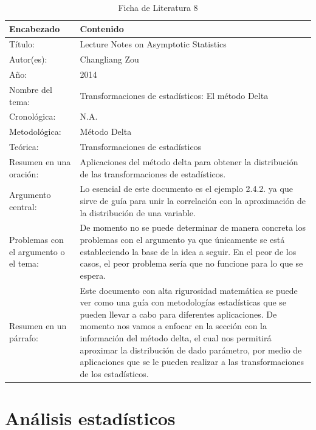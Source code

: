 \begin{table}[H]
    \caption{Ficha de Literatura 8}
    \begin{center}
        \begin{tabular}{  m{3cm} | m{12cm}  }
        \hline\textbf{ Encabezado} & \textbf{Contenido }\\ \hline
        Título: &  Lecture Notes on Asymptotic Statistics \\ \hline
        Autor(es): & Changliang Zou \\ \hline
        Año: &  2014\\ \hline
        Nombre del tema: &  Transformaciones de estadísticos: El método Delta\\ \hline
        Cronológica: &  N.A. \\ \hline
        Metodológica: & Método Delta \\  \hline
        Teórica: &  Transformaciones de estadísticos\\ \hline
        Resumen en una oración: &  Aplicaciones del método delta para obtener la distribución de las transformaciones de estadísticos. \\ \hline
        Argumento central: &  Lo esencial de este documento es el ejemplo 2.4.2. ya que sirve de guía para unir la correlación con la aproximación de la distribución de una variable. \\ \hline
        Problemas con el argumento o el tema: &  De momento no se puede determinar de manera concreta los problemas con el argumento ya que únicamente se está estableciendo la base de la idea a seguir. En el peor de los casos, el peor problema sería que no funcione para lo que se espera.\\ \hline
        Resumen en un párrafo: & Este documento con alta rigurosidad matemática se puede ver como una guía con metodologías estadísticas que se pueden llevar a cabo para diferentes aplicaciones. De momento nos vamos a enfocar en la sección con la información del método delta, el cual nos permitirá aproximar la distribución de dado parámetro, por medio de aplicaciones que se le pueden realizar a las transformaciones de los estadísticos.\\ \hline
        \end{tabular}
    \end{center}
\end{table}

\newpage

\section{Análisis estadísticos}
